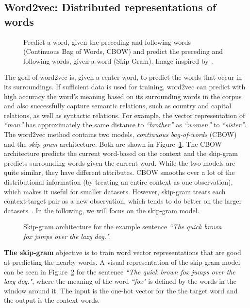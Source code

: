 \subsection{Word2vec: Distributed representations of words}
\label{subsec:word2vec}
\begin{figure}
\centering 
\resizebox{0.63\textwidth}{0.5\textwidth}{      

}
\caption{Predict a word, given the preceding and following words (Continuous Bag of Words, CBOW) and predict the preceding and following words, given a word (Skip-Gram). Image inspired by~.}
\label{fig:w2v}
\end{figure}
The goal of word2vec is, given a center word, to predict the words that occur in its surroundings. If sufficient data is used for training, word2vec can predict with high accuracy the word's meaning based on its surrounding words in the corpus and also successfully capture semantic relations, such as country and capital relations, as well as syntactic relations. For example, the vector representation of  \emph{``man''} has approximately the same distance to \emph{``brother''} as \emph{``women''} to \emph{``sister''}. \\
The word2vec method contains two models, \emph{continuous bag-of-words} (CBOW) and the \emph{skip-gram} architecture. Both are shown in Figure~\ref{fig:w2v}. The CBOW architecture predicts the current word-based on the context and the skip-gram predicts surrounding words given the current word. While the two models are quite similar, they have different attributes. CBOW smooths over a lot of the distributional information (by treating an entire context as one observation), which makes it useful for smaller datasets. However, skip-gram treats each context-target pair as a new observation, which tends to do better on the larger datasets~. In the following, we will focus on the skip-gram model. \\
\begin{figure}
\centering 
\resizebox{0.8\textwidth}{0.5\textwidth}{      

}
\caption{Skip-gram architecture for the example sentence \emph{``The quick brown fox jumps over the lazy dog."}. }
\label{fig:skip_w2v}
\end{figure}
\noindent
\textbf{The skip-gram} objective is to train word vector representations that are good at predicting the nearby words. A visual representation of the skip-gram model can be seen in Figure~\ref{fig:skip_w2v} for the sentence \emph{``The quick brown fox jumps over the lazy dog."}, where the meaning of the word \emph{``fox"} is defined by the words in the window around it. The input is the one-hot vector for the the target word and the output is the context words.\\

